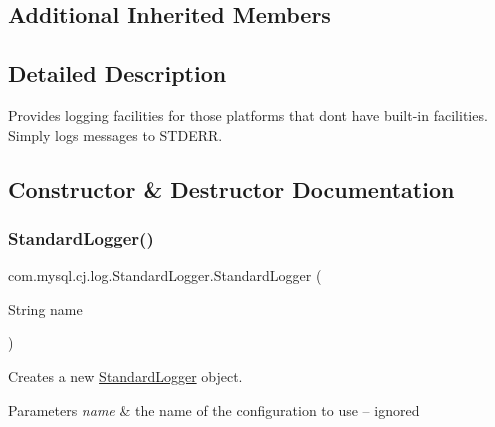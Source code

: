 \subsection*{Additional Inherited Members}


\subsection{Detailed Description}
Provides logging facilities for those platforms that don\textquotesingle{}t have built-\/in facilities. Simply logs messages to S\+T\+D\+E\+RR. 

\subsection{Constructor \& Destructor Documentation}
\mbox{\label{classcom_1_1mysql_1_1cj_1_1log_1_1_standard_logger_a9d62265f1433d6b78f2e9a90cc2ff756}} 
\subsubsection{\texorpdfstring{Standard\+Logger()}{StandardLogger()}\hspace{0.1cm}{\footnotesize\ttfamily [1/2]}}
{\footnotesize\ttfamily com.\+mysql.\+cj.\+log.\+Standard\+Logger.\+Standard\+Logger (\begin{DoxyParamCaption}\item[{String}]{name }\end{DoxyParamCaption})}

Creates a new \mbox{\hyperlink{classcom_1_1mysql_1_1cj_1_1log_1_1_standard_logger}{Standard\+Logger}} object.


\begin{DoxyParams}{Parameters}
{\em name} & the name of the configuration to use -- ignored \\
\hline
\end{DoxyParams}
\mbox{\label{classcom_1_1mysql_1_1cj_1_1log_1_1_standard_logger_afe35f964cf1fe918e883ed4d4f072fbc}} 

